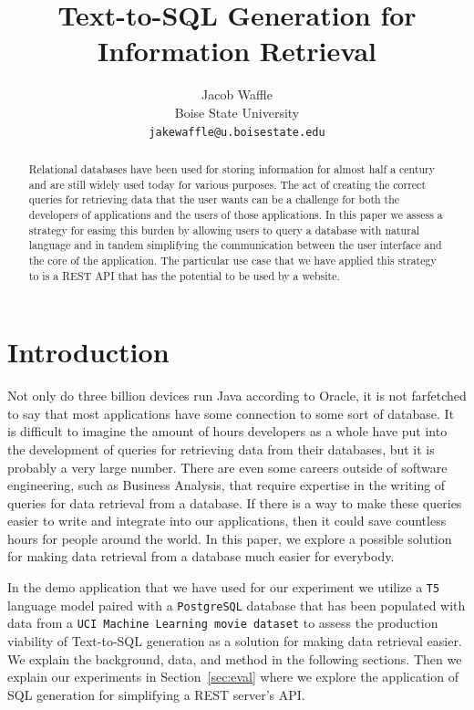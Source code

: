 \documentclass[11pt]{article}
\title{Text-to-SQL Generation for Information Retrieval}
\author{
    Jacob Waffle \\
    Boise State University\\
    \texttt{jakewaffle@u.boisestate.edu} \\
}
\begin{document}
\maketitle
\begin{abstract}
Relational databases have been used for storing information for almost half a century and are still widely used today for various purposes. The act of creating the correct queries for retrieving data that the user wants can be a challenge for both the developers of applications and the users of those applications. In this paper we assess a strategy for easing this burden by allowing users to query a database with natural language and in tandem simplifying the communication between the user interface and the core of the application. The particular use case that we have applied this strategy to is a REST API that has the potential to be used by a website.
\end{abstract}

\section{Introduction}

Not only do three billion devices run Java according to Oracle, it is not farfetched to say that most applications have some connection to some sort of database. It is difficult to imagine the amount of hours developers as a whole have put into the development of queries for retrieving data from their databases, but it is probably a very large number. There are even some careers outside of software engineering, such as Business Analysis, that require expertise in the writing of queries for data retrieval from a database. If there is a way to make these queries easier to write and integrate into our applications, then it could save countless hours for people around the world. In this paper, we explore a possible solution for making data retrieval from a database much easier for everybody.

In the demo application that we have used for our experiment we utilize a \texttt{T5} language model \citep{raffel2020exploring} paired with a \texttt{PostgreSQL} database that has been populated with data from a \texttt{UCI Machine Learning movie dataset} \citep{misc_movie_132} to assess the production viability of Text-to-SQL generation as a solution for making data retrieval easier. We explain the background, data, and method in the following sections. Then we explain our experiments in Section~\ref{sec:eval} where we explore the application of SQL generation for simplifying a REST server's API.
\end{document}
